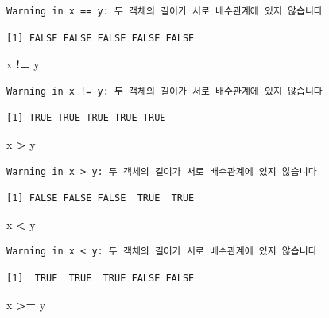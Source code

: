 \documentclass[
  11pt,
]{krantz}
\newenvironment{Shaded}{\begin{snugshade}}{\end{snugshade}}
\newcommand{\NormalTok}[1]{#1}
\newcommand{\OperatorTok}[1]{\textcolor[rgb]{0.43,0.43,0.43}{\textbf{#1}}}
\newcommand{\StringTok}[1]{\textcolor[rgb]{0.5,0.5,0.5}{#1}}
\begin{document}
\begin{verbatim}
Warning in x == y: 두 객체의 길이가 서로 배수관계에 있지 않습니다
\end{verbatim}

\begin{verbatim}
[1] FALSE FALSE FALSE FALSE FALSE
\end{verbatim}

\begin{Shaded}
\begin{Highlighting}[]
\NormalTok{x }\OperatorTok{!=}\StringTok{ }\NormalTok{y}
\end{Highlighting}
\end{Shaded}

\begin{verbatim}
Warning in x != y: 두 객체의 길이가 서로 배수관계에 있지 않습니다
\end{verbatim}

\begin{verbatim}
[1] TRUE TRUE TRUE TRUE TRUE
\end{verbatim}

\begin{Shaded}
\begin{Highlighting}[]
\NormalTok{x }\OperatorTok{>}\StringTok{ }\NormalTok{y}
\end{Highlighting}
\end{Shaded}

\begin{verbatim}
Warning in x > y: 두 객체의 길이가 서로 배수관계에 있지 않습니다
\end{verbatim}

\begin{verbatim}
[1] FALSE FALSE FALSE  TRUE  TRUE
\end{verbatim}

\begin{Shaded}
\begin{Highlighting}[]
\NormalTok{x }\OperatorTok{<}\StringTok{ }\NormalTok{y}
\end{Highlighting}
\end{Shaded}

\begin{verbatim}
Warning in x < y: 두 객체의 길이가 서로 배수관계에 있지 않습니다
\end{verbatim}

\begin{verbatim}
[1]  TRUE  TRUE  TRUE FALSE FALSE
\end{verbatim}

\begin{Shaded}
\begin{Highlighting}[]
\NormalTok{x }\OperatorTok{>=}\StringTok{ }\NormalTok{y}
\end{Highlighting}
\end{Shaded}
\end{document}
